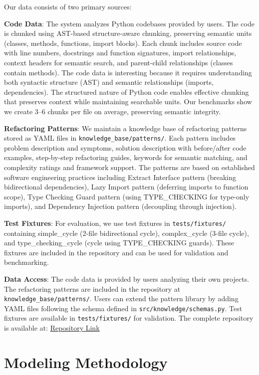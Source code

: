 \documentclass[paper=a4, fontsize=11pt]{scrartcl} %
\begin{document}
Our data consists of two primary sources:

\textbf{Code Data}: The system analyzes Python codebases provided by users. The code is chunked using AST-based structure-aware chunking, preserving semantic units (classes, methods, functions, import blocks). Each chunk includes source code with line numbers, docstrings and function signatures, import relationships, context headers for semantic search, and parent-child relationships (classes contain methods). The code data is interesting because it requires understanding both syntactic structure (AST) and semantic relationships (imports, dependencies). The structured nature of Python code enables effective chunking that preserves context while maintaining searchable units. Our benchmarks show we create 3--6 chunks per file on average, preserving semantic integrity.

\textbf{Refactoring Patterns}: We maintain a knowledge base of refactoring patterns stored as YAML files in \texttt{knowledge\_base/patterns/}. Each pattern includes problem description and symptoms, solution description with before/after code examples, step-by-step refactoring guides, keywords for semantic matching, and complexity ratings and framework support. The patterns are based on established software engineering practices including Extract Interface pattern (breaking bidirectional dependencies), Lazy Import pattern (deferring imports to function scope), Type Checking Guard pattern (using TYPE\_CHECKING for type-only imports), and Dependency Injection pattern (decoupling through injection).

\textbf{Test Fixtures}: For evaluation, we use test fixtures in \texttt{tests/fixtures/} containing simple\_cycle (2-file bidirectional cycle), complex\_cycle (3-file cycle), and type\_checking\_cycle (cycle using TYPE\_CHECKING guards). These fixtures are included in the repository and can be used for validation and benchmarking.

\textbf{Data Access}: The code data is provided by users analyzing their own projects. The refactoring patterns are included in the repository at \texttt{knowledge\_base/patterns/}. Users can extend the pattern library by adding YAML files following the schema defined in \texttt{src/knowledge/schemas.py}. Test fixtures are available in \texttt{tests/fixtures/} for validation. The complete repository is available at: \href{https://github.com/ritikmahy5/Code-Circular-Dependency-Detection}{Repository Link}

\section{Modeling Methodology}
\end{document}
